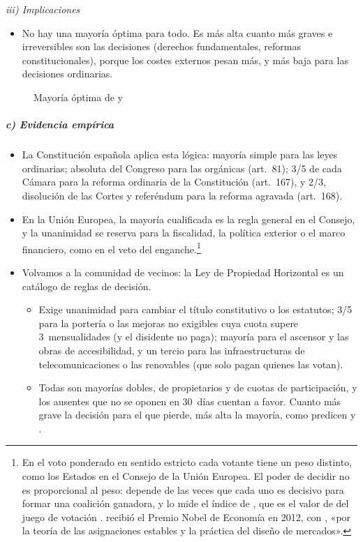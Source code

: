 \documentclass[11pt]{article}
\begin{document}
\hspace*{3.6em}\emph{iii) Implicaciones}

\begin{itemize}
\item No hay una mayoría óptima para todo. Es más alta cuanto más graves e irreversibles son las decisiones (derechos fundamentales, reformas constitucionales), porque los costes externos pesan más, y más baja para las decisiones ordinarias.
\end{itemize}

\begin{figure}[H]
\centering
\caption{Mayoría óptima de  y }\label{fig:buchanan-tullock}
\end{figure}

\subparagraph{c) Evidencia empírica}

\begin{itemize}
\item La Constitución española aplica esta lógica: mayoría simple para las leyes ordinarias; absoluta del Congreso para las orgánicas (art.~81); 3/5 de cada Cámara para la reforma ordinaria de la Constitución (art.~167), y 2/3, disolución de las Cortes y referéndum para la reforma agravada (art.~168)\nocite{BOE1978Constitucion}.
\item En la Unión Europea, la mayoría cualificada es la regla general en el Consejo, y la unanimidad se reserva para la fiscalidad, la política exterior o el marco financiero, como en el veto del enganche.\footnote{En el voto ponderado en sentido estricto cada votante tiene un peso distinto, como los Estados en el Consejo de la Unión Europea. El poder de decidir no es proporcional al peso: depende de las veces que cada uno es decisivo para formar una coalición ganadora, y lo mide el índice de \textcite{ShapleyShubik1954Method}, que es el valor de  del juego de votación .  recibió el Premio Nobel de Economía en 2012, con , «por la teoría de las asignaciones estables y la práctica del diseño de mercados»\nocite{Nobel2012RothShapley}.}
\item Volvamos a la comunidad de vecinos: la Ley de Propiedad Horizontal es un catálogo de reglas de decisión\nocite{BOE1960LPH}.
  \begin{itemize}
  \item Exige unanimidad para cambiar el título constitutivo o los estatutos; 3/5 para la portería o las mejoras no exigibles cuya cuota supere 3~mensualidades (y el disidente no paga); mayoría para el ascensor y las obras de accesibilidad, y un tercio para las infraestructuras de telecomunicaciones o las renovables (que solo pagan quienes las votan).
  \item Todas son mayorías dobles, de propietarios y de cuotas de participación, y los ausentes que no se oponen en 30~días cuentan a favor. Cuanto más grave la decisión para el que pierde, más alta la mayoría, como predicen  y .
  \end{itemize}
\end{itemize}
\end{document}
